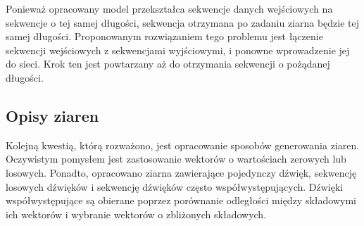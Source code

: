 {{{            Ponieważ opracowany model przekształca sekwencje danych wejściowych na sekwencje
            o tej samej długości, sekwencja otrzymana po zadaniu ziarna będzie tej samej długości.
            Proponowanym rozwiązaniem tego problemu jest łączenie sekwencji wejściowych z sekwencjami wyjściowymi,
            i ponowne wprowadzenie jej do sieci. Krok ten jest powtarzany aż do otrzymania sekwencji o pożądanej długości.
        }

        \subsection{Opisy ziaren}
        {
            Kolejną kwestią, którą rozważono, jest opracowanie sposobów generowania ziaren.
            Oczywistym pomysłem jest zastosowanie wektorów o wartościach zerowych lub losowych.
            Ponadto, opracowano ziarna zawierające pojedynczy dźwięk, sekwencję losowych dźwięków
            i sekwencję dźwięków często współwystępujących. Dźwięki współwystępujące są obierane poprzez
            porównanie odległości między składowymi ich wektorów i wybranie wektorów o zbliżonych składowych.
        }
    }
}